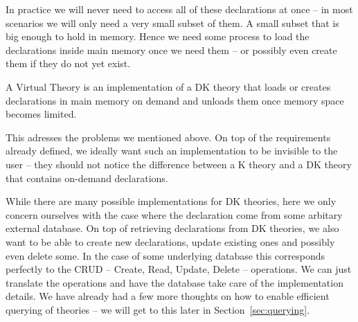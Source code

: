 In practice we will never need to access all of these declarations at once -- in most
scenarios we will only need a very small subset of them. A small subset that is big enough
to hold in memory. Hence we need some process to load the declarations inside main memory
once we need them -- or possibly even create them if they do not yet exist.

\begin{mydef}
  A Virtual Theory is an implementation of a DK theory that loads or creates declarations in main memory on demand and unloads them once memory space becomes limited.
\end{mydef}

This adresses the problems we mentioned above. On top of the requirements already defined,
we ideally want such an implementation to be invisible to the user -- they should not
notice the difference between a K theory and a DK theory that contains on-demand
declarations.

While there are many possible implementations for DK theories, here we only concern ourselves
with the case where the declaration come from some arbitary external database. On top of
retrieving declarations from DK theories, we also want to be able to create new declarations,
update existing ones and possibly even delete some. In the case of some underlying database
this corresponds perfectly to the CRUD -- Create, Read, Update, Delete -- operations. We can
just translate the operations and have the database take care of the implementation details. We
have already had a few more thoughts on how to enable efficient querying of theories -- we will
get to this later in Section~\ref{sec:querying}.


